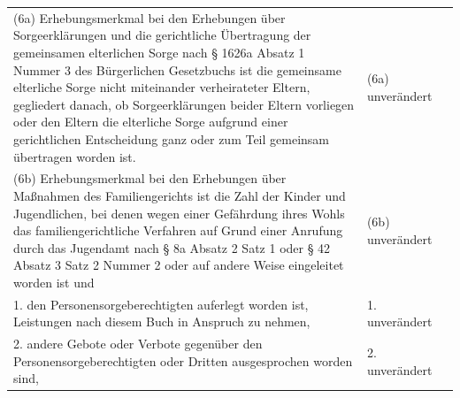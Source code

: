 \documentclass[10pt,a4paper,landscape]{article}
\begin{document}
\begin{longtable}{|L{8.2cm}|L{8.2cm}|L{8.2cm}|}
(6a) Erhebungsmerkmal bei den  \newline Erhebungen über Sorgeerklärungen und  \newline die gerichtliche Übertragung der  \newline gemeinsamen elterlichen Sorge nach \S{}  \newline 1626a Absatz 1 Nummer 3 des  \newline Bürgerlichen Gesetzbuchs ist die  \newline gemeinsame elterliche Sorge nicht  \newline miteinander verheirateter Eltern, gegliedert  \newline danach, ob Sorgeerklärungen beider Eltern  \newline vorliegen oder den Eltern die elterliche  \newline Sorge aufgrund einer gerichtlichen  \newline Entscheidung ganz oder zum Teil  \newline gemeinsam übertragen worden ist. & (6a) unverändert &  \\
\hhline{|---|}
(6b) Erhebungsmerkmal bei den  \newline Erhebungen über Maßnahmen des  \newline Familiengerichts ist die Zahl der Kinder und  \newline Jugendlichen, bei denen wegen einer  \newline Gefährdung ihres Wohls das  \newline familiengerichtliche Verfahren auf Grund  \newline einer Anrufung durch das Jugendamt nach  \newline \S{} 8a Absatz 2 Satz 1 oder \S{} 42 Absatz 3  \newline Satz 2 Nummer 2 oder auf andere Weise  \newline eingeleitet worden ist und & (6b) unverändert &  \\
\hhline{|---|}
1.   \newline den Personensorgeberechtigten auferlegt  \newline worden ist, Leistungen nach diesem Buch  \newline in Anspruch zu nehmen, & 1. unverändert &  \\
\hhline{|---|}
2.   \newline andere Gebote oder Verbote gegenüber  \newline den Personensorgeberechtigten oder  \newline Dritten ausgesprochen worden sind, & 2. unverändert &  \\

\end{longtable}
\end{document}
